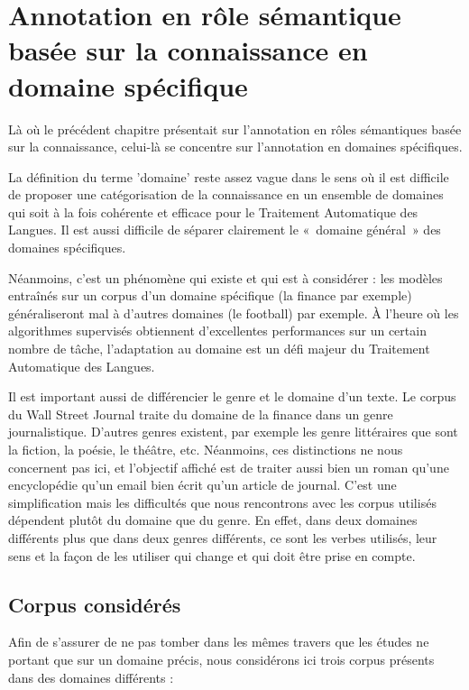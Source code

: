 \chapter{Annotation en rôle sémantique basée sur la connaissance en domaine spécifique}
\label{ch:domainsrl}

Là où le précédent chapitre présentait sur l'annotation en rôles sémantiques
basée sur la connaissance, celui-là se concentre sur l'annotation en domaines
spécifiques.

La définition du terme 'domaine' reste assez vague dans le sens où il est
difficile de proposer une catégorisation de la connaissance en un ensemble de
domaines qui soit à la fois cohérente et efficace pour le Traitement Automatique
des Langues. Il est aussi difficile de séparer clairement le «~domaine
général~» des domaines spécifiques.

Néanmoins, c'est un phénomène qui existe et qui est à considérer : les modèles
entraînés sur un corpus d'un domaine spécifique (la finance par exemple)
généraliseront mal à d'autres domaines (le football) par exemple. À l'heure où
les algorithmes supervisés obtiennent d'excellentes performances sur un certain
nombre de tâche, l'adaptation au domaine est un défi majeur du Traitement
Automatique des Langues.

Il est important aussi de différencier le genre et le domaine d'un texte. Le
corpus du Wall Street Journal traite du domaine de la finance dans un genre
journalistique. D'autres genres existent, par exemple les genre littéraires que
sont la fiction, la poésie, le théâtre, etc. Néanmoins, ces distinctions ne
nous concernent pas ici, et l'objectif affiché est de traiter aussi bien un
roman qu'une encyclopédie qu'un email bien écrit qu'un article de journal.
C'est une simplification mais les difficultés que nous rencontrons avec les
corpus utilisés dépendent plutôt du domaine que du genre. En effet, dans deux
domaines différents plus que dans deux genres différents, ce sont les verbes
utilisés, leur sens et la façon de les utiliser qui change et qui doit être
prise en compte.

\section{Corpus considérés}

Afin de s'assurer de ne pas tomber dans les mêmes travers que les études ne
portant que sur un domaine précis, nous considérons ici trois corpus présents
dans des domaines différents :

